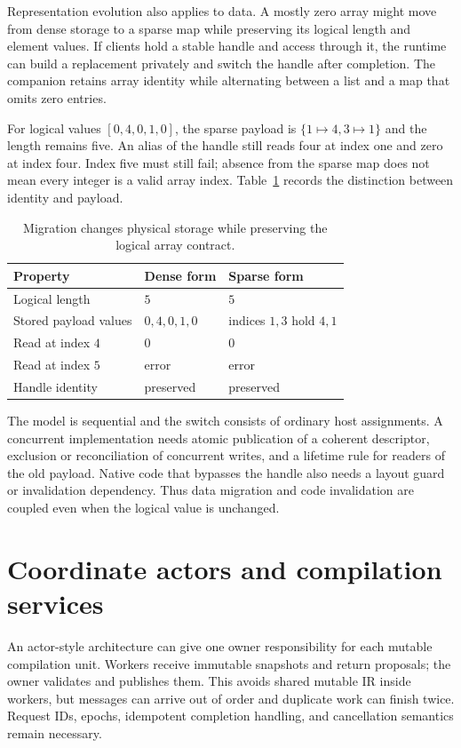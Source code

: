 Representation evolution also applies to data.
A mostly zero array might move from dense storage to a sparse map while preserving its logical length and element values.
If clients hold a stable handle and access through it, the runtime can build a replacement privately and switch the handle after completion.
The companion retains array identity while alternating between a list and a map that omits zero entries.

For logical values $[0,4,0,1,0]$, the sparse payload is $\{1\mapsto4,3\mapsto1\}$ and the length remains five.
An alias of the handle still reads four at index one and zero at index four.
Index five must still fail; absence from the sparse map does not mean every integer is a valid array index.
Table~\ref{tab:ch67-layout} records the distinction between identity and payload.

\begin{table}[htbp]
\caption{Migration changes physical storage while preserving the logical array contract.}
\label{tab:ch67-layout}
\centering
\begin{tabular}{lll}
\toprule
Property & Dense form & Sparse form \\
\midrule
Logical length & $5$ & $5$ \\
Stored payload values & $0,4,0,1,0$ & indices $1,3$ hold $4,1$ \\
Read at index $4$ & $0$ & $0$ \\
Read at index $5$ & error & error \\
Handle identity & preserved & preserved \\
\bottomrule
\end{tabular}
\end{table}

The model is sequential and the switch consists of ordinary host assignments.
A concurrent implementation needs atomic publication of a coherent descriptor, exclusion or reconciliation of concurrent writes, and a lifetime rule for readers of the old payload.
Native code that bypasses the handle also needs a layout guard or invalidation dependency.
Thus data migration and code invalidation are coupled even when the logical value is unchanged.

\section{Coordinate actors and compilation services}
\label{sec:ch67-actors}

An actor-style architecture can give one owner responsibility for each mutable compilation unit.
Workers receive immutable snapshots and return proposals; the owner validates and publishes them.
This avoids shared mutable IR inside workers, but messages can arrive out of order and duplicate work can finish twice.
Request IDs, epochs, idempotent completion handling, and cancellation semantics remain necessary.

